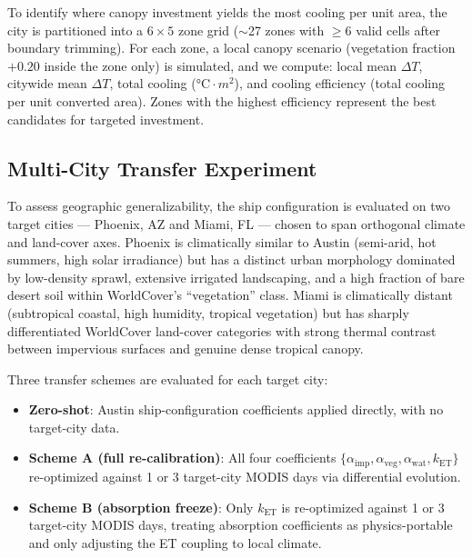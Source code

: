 \documentclass[12pt, letterpaper]{article}
\begin{document}
To identify where canopy investment yields the most cooling per unit area,
the city is partitioned into a $6 \times 5$ zone grid ($\sim$27 zones with
$\geq 6$ valid cells after boundary trimming). For each zone, a local canopy
scenario (vegetation fraction $+0.20$ inside the zone only) is simulated,
and we compute: local mean $\Delta T$, citywide mean $\Delta T$, total
cooling ($\si{\degreeCelsius\cdot m^2}$), and cooling efficiency
(total cooling per unit converted area). Zones with the highest efficiency
represent the best candidates for targeted investment.

\subsection{Multi-City Transfer Experiment}
\label{sec:transfer_methods}

To assess geographic generalizability, the ship configuration is evaluated
on two target cities — Phoenix, AZ and Miami, FL — chosen to span orthogonal
climate and land-cover axes. Phoenix is climatically similar to Austin
(semi-arid, hot summers, high solar irradiance) but has a distinct urban
morphology dominated by low-density sprawl, extensive irrigated landscaping,
and a high fraction of bare desert soil within WorldCover's ``vegetation''
class. Miami is climatically distant (subtropical coastal, high humidity,
tropical vegetation) but has sharply differentiated WorldCover land-cover
categories with strong thermal contrast between impervious surfaces and
genuine dense tropical canopy.

Three transfer schemes are evaluated for each target city:

\begin{itemize}[noitemsep]
  \item \textbf{Zero-shot}: Austin ship-configuration coefficients applied
        directly, with no target-city data.
  \item \textbf{Scheme A (full re-calibration)}: All four coefficients
        $\{\alpha_{\mathrm{imp}}, \alpha_{\mathrm{veg}}, \alpha_{\mathrm{wat}},
        k_{\mathrm{ET}}\}$ re-optimized against 1 or 3 target-city MODIS days
        via differential evolution.
  \item \textbf{Scheme B (absorption freeze)}: Only $k_{\mathrm{ET}}$ is
        re-optimized against 1 or 3 target-city MODIS days, treating absorption
        coefficients as physics-portable and only adjusting the ET coupling
        to local climate.
\end{itemize}
\end{document}
